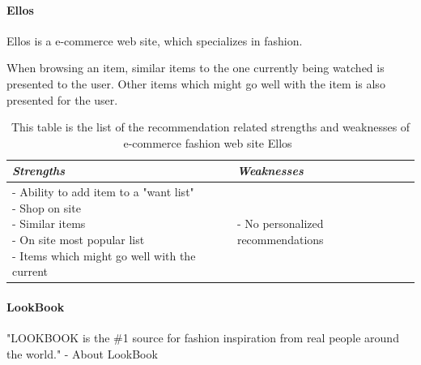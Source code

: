 \paragraph{Ellos~\cite{Ellos}} %
\label{par:ellos}
    Ellos is a e-commerce web site, which specializes in fashion.

    When browsing an item, similar items to the one currently being watched is presented to the user.
    Other items which might go well with the item is also presented for the user.
    \begin{table}[H]
        \centering
        \begin{tabular}{l|l}
            \toprule
            \emph{Strengths} & \emph{Weaknesses} \\ \hline
            \pbox{9cm}{
                - Ability to add item to a "want list" \\
                - Shop on site \\
                - Similar items \\
                - On site most popular list \\
                - Items which might go well with the current
            } & \pbox{9cm}{
                - No personalized recommendations \\
            } \\ \bottomrule
        \end{tabular}
        \caption[Recommendation related strengths and weaknesses of Ellos~\cite{Ellos}]{This table is the list of the recommendation related strengths and weaknesses of e-commerce fashion web site Ellos~\cite{Ellos}}
        \label{table:ecommenreceEllos}
    \end{table}

\paragraph{LookBook} %
\label{par:lookbook}
    "LOOKBOOK is the \#1 source for fashion inspiration from real people around the world." - About LookBook~\cite{LookBook}


